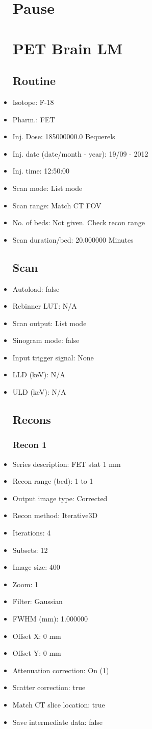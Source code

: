 \documentclass[12pt]{article}
\begin{document}
\begin{itemize}
\section{Pause}
\section{PET Brain LM}\subsection{Routine}
\item Isotope: F-18
\item Pharm.: FET
\item Inj. Dose: 185000000.0 Bequerels
\item Inj. date (date/month - year): 19/09 - 2012
\item Inj. time: 12:50:00
\item Scan mode: List mode
\item Scan range: Match CT FOV
\item No. of beds: Not given. Check recon range
\item Scan duration/bed: 20.000000 Minutes
\subsection{Scan}
\item Autoload: false
\item Rebinner LUT: N/A
\item Scan output: List mode
\item Sinogram mode: false
\item Input trigger signal: None
\item LLD (keV): N/A
\item ULD (keV): N/A
\subsection{Recons}
\subsubsection{Recon 1}
\item Series description: FET stat 1 mm
\item Recon range (bed): 1 to 1
\item Output image type: Corrected
\item Recon method: Iterative3D
\item Iterations: 4
\item Subsets: 12
\item Image size: 400
\item Zoom: 1
\item Filter: Gaussian
\item FWHM (mm): 1.000000
\item Offset X: 0 mm
\item Offset Y: 0 mm
\item Attenuation correction: On (1)
\item Scatter correction: true
\item Match CT slice location: true
\item Save intermediate data: false

\end{itemize}
\end{document}
